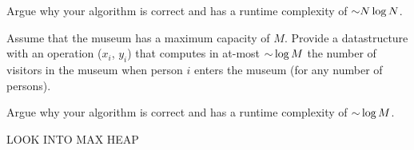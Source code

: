 \begin{problem}
\begin{questions}
\item Argue why your algorithm  is correct and has a runtime complexity of $\mathord{\sim}N \log N$.

\item Assume that the museum has a maximum capacity of $M$. Provide a datastructure with an operation ($x_i$, $y_i$) that computes in at-most $\mathord{\sim}\log M$ the number of visitors in the museum when person $i$ enters the museum (for any number of persons).

\item Argue why your algorithm  is correct and has a runtime complexity of $\mathord{\sim}\log M$.

LOOK INTO MAX HEAP

\end{questions}

\end{problem}


\SUBMITMSG{}
\DEFAULTGRADING{}

